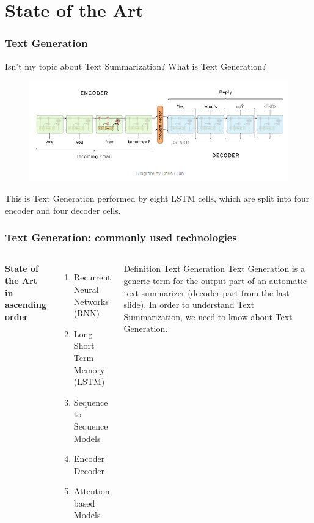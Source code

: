 \documentclass{beamer}
\begin{document}
\section{State of the Art}
\begin{frame}
\frametitle{Text Generation}
Isn't my topic about Text Summarization? What is Text Generation?
\begin{figure}
	\includegraphics[width=0.9\linewidth]{photo/encoder_decoder}
\end{figure}
This is Text Generation performed by eight LSTM cells, which are split into four encoder and four decoder cells.
\end{frame}
%
%
\begin{frame}
\frametitle{Text Generation: commonly used technologies}
\begin{columns}[c] %

\textbf{State of the Art in ascending order}
\begin{enumerate}
\item Recurrent Neural Networks (RNN)
\item Long Short Term Memory (LSTM)
\item Sequence to Sequence Models
\item Encoder Decoder
\item Attention based Models
\end{enumerate}


\begin{block}{Definition Text Generation}
Text Generation is a generic term for the output part of an automatic text summarizer (decoder part from the last slide). In order to understand Text Summarization, we need to know about Text Generation.
\end{block}
\end{columns}
\end{frame}
\end{document}
